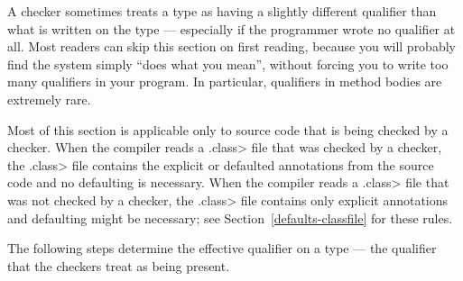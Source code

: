 A checker sometimes treats a type as having a slightly different qualifier
than what is written on the type --- especially if the programmer wrote no
qualifier at all.
Most readers can skip this section on first reading, because you will
probably find the system simply ``does what you mean'', without forcing
you to write too many qualifiers in your program.
In particular, qualifiers in method bodies are extremely rare.

Most of this section is applicable only to source code that is being
checked by a checker.
%
When the compiler reads a \<.class> file that was checked by a
checker, the \<.class> file contains the explicit or defaulted
annotations from the source code and no defaulting is necessary.
%
When the compiler reads a \<.class> file that was not checked by a
checker, the \<.class> file contains only explicit annotations and
defaulting might be necessary; see Section~\ref{defaults-classfile}
for these rules.

  The following steps determine the effective
qualifier on a type --- the qualifier that the checkers treat as being present.


